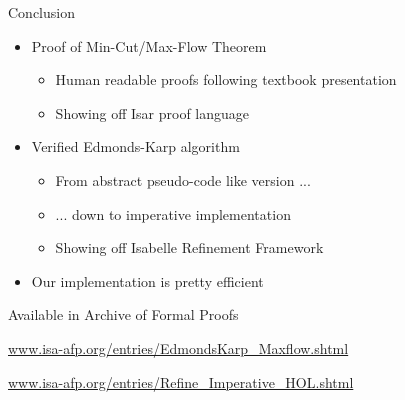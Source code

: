 \documentclass[fleqn]{beamer}
\begin{document}
\begin{frame}{Conclusion}
  \begin{itemize}
   \item Proof of Min-Cut/Max-Flow Theorem
    \begin{itemize}
     \item Human readable proofs following textbook presentation
     \item Showing off Isar proof language
    \end{itemize}
   \item Verified Edmonds-Karp algorithm
    \begin{itemize}
     \item From abstract pseudo-code like version ...
     \item ... down to imperative implementation
     \item Showing off Isabelle Refinement Framework
    \end{itemize}
   \item Our implementation is pretty efficient

  \end{itemize}
  \vfill
  \center
  Available in Archive of Formal Proofs
  
  \url{www.isa-afp.org/entries/EdmondsKarp_Maxflow.shtml}
  
  \url{www.isa-afp.org/entries/Refine_Imperative_HOL.shtml}
  \vfill
  
    
    
\end{frame}
\end{document}
